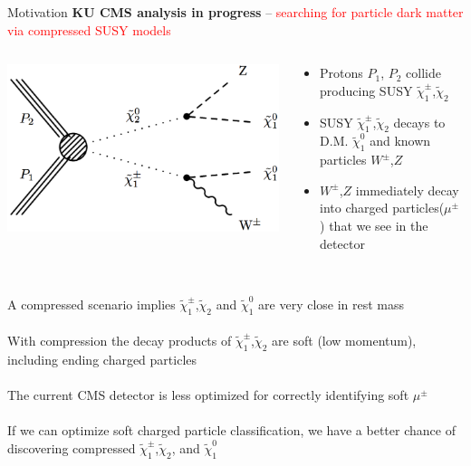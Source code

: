 \documentclass[10pt,handout]{beamer}
\begin{document}
\begin{frame}{Motivation}
\textbf{KU CMS analysis in progress} -- \textcolor{red}{searching for particle dark matter via compressed SUSY models}\\

\begin{columns}
\begin{column}{0.5\textwidth}
\includegraphics[scale=.75]{TChiWZ.png}
\end{column}
\begin{column}{0.5\textwidth}
\begin{itemize}
\small
\item Protons $P_1$, $P_2$ collide producing SUSY $\tilde \chi^{\pm}_1$,$\tilde \chi_2$ 
\item SUSY $\tilde \chi^{\pm}_1$,$\tilde \chi_2$ decays to D.M. $\tilde \chi^0_1$ and known particles $W^\pm$,$Z$
\item $W^\pm$,$Z$ immediately decay into charged particles($\mu^\pm$) that we see in the detector
\end{itemize}
\end{column}
\end{columns}
\small
\quad \quad \\
A compressed scenario implies $\tilde \chi^{\pm}_1$,$\tilde \chi_2$ and  $\tilde \chi^0_1$ are very close in rest mass\\
\quad \quad \\
With compression the decay products of $\tilde \chi^{\pm}_1$,$\tilde \chi_2$ are soft (low momentum), including ending charged particles\\
\quad \quad \\
The current CMS detector is less optimized for correctly identifying soft $\mu^\pm$\\
\quad \quad \\
If we can optimize soft charged particle classification, we have a better chance of discovering compressed $\tilde \chi^{\pm}_1$,$\tilde \chi_2$, and $\tilde \chi^0_1$

\end{frame}
\end{document}
